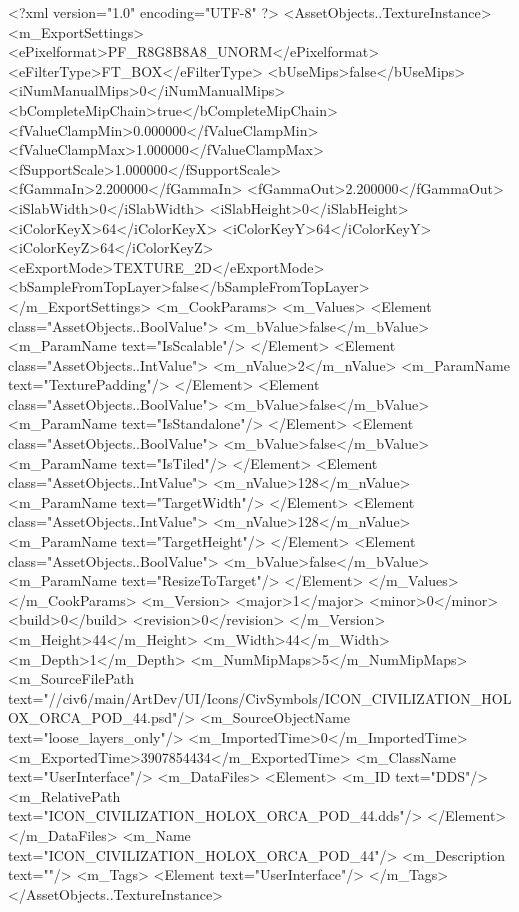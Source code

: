 <?xml version="1.0" encoding="UTF-8" ?>
<AssetObjects..TextureInstance>
	<m_ExportSettings>
		<ePixelformat>PF_R8G8B8A8_UNORM</ePixelformat>
		<eFilterType>FT_BOX</eFilterType>
		<bUseMips>false</bUseMips>
		<iNumManualMips>0</iNumManualMips>
		<bCompleteMipChain>true</bCompleteMipChain>
		<fValueClampMin>0.000000</fValueClampMin>
		<fValueClampMax>1.000000</fValueClampMax>
		<fSupportScale>1.000000</fSupportScale>
		<fGammaIn>2.200000</fGammaIn>
		<fGammaOut>2.200000</fGammaOut>
		<iSlabWidth>0</iSlabWidth>
		<iSlabHeight>0</iSlabHeight>
		<iColorKeyX>64</iColorKeyX>
		<iColorKeyY>64</iColorKeyY>
		<iColorKeyZ>64</iColorKeyZ>
		<eExportMode>TEXTURE_2D</eExportMode>
		<bSampleFromTopLayer>false</bSampleFromTopLayer>
	</m_ExportSettings>
	<m_CookParams>
		<m_Values>
			<Element class="AssetObjects..BoolValue">
				<m_bValue>false</m_bValue>
				<m_ParamName text="IsScalable"/>
			</Element>
			<Element class="AssetObjects..IntValue">
				<m_nValue>2</m_nValue>
				<m_ParamName text="TexturePadding"/>
			</Element>
			<Element class="AssetObjects..BoolValue">
				<m_bValue>false</m_bValue>
				<m_ParamName text="IsStandalone"/>
			</Element>
			<Element class="AssetObjects..BoolValue">
				<m_bValue>false</m_bValue>
				<m_ParamName text="IsTiled"/>
			</Element>
			<Element class="AssetObjects..IntValue">
				<m_nValue>128</m_nValue>
				<m_ParamName text="TargetWidth"/>
			</Element>
			<Element class="AssetObjects..IntValue">
				<m_nValue>128</m_nValue>
				<m_ParamName text="TargetHeight"/>
			</Element>
			<Element class="AssetObjects..BoolValue">
				<m_bValue>false</m_bValue>
				<m_ParamName text="ResizeToTarget"/>
			</Element>
		</m_Values>
	</m_CookParams>
	<m_Version>
		<major>1</major>
		<minor>0</minor>
		<build>0</build>
		<revision>0</revision>
	</m_Version>
	<m_Height>44</m_Height>
	<m_Width>44</m_Width>
	<m_Depth>1</m_Depth>
	<m_NumMipMaps>5</m_NumMipMaps>
	<m_SourceFilePath text="//civ6/main/ArtDev/UI/Icons/CivSymbols/ICON_CIVILIZATION_HOLOX_ORCA_POD_44.psd"/>
	<m_SourceObjectName text="loose_layers_only"/>
	<m_ImportedTime>0</m_ImportedTime>
	<m_ExportedTime>3907854434</m_ExportedTime>
	<m_ClassName text="UserInterface"/>
	<m_DataFiles>
		<Element>
			<m_ID text="DDS"/>
			<m_RelativePath text="ICON_CIVILIZATION_HOLOX_ORCA_POD_44.dds"/>
		</Element>
	</m_DataFiles>
	<m_Name text="ICON_CIVILIZATION_HOLOX_ORCA_POD_44"/>
	<m_Description text=""/>
	<m_Tags>
		<Element text="UserInterface"/>
	</m_Tags>
</AssetObjects..TextureInstance>

